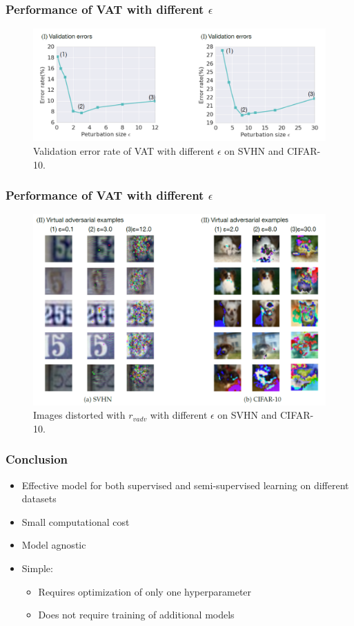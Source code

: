 \begin{frame}
\frametitle{Performance of VAT with different \(\epsilon\)}
\begin{figure}
\centering
\includegraphics[width=0.8\columnwidth]{different_eps_val.png}
\caption{Validation error rate of VAT with different \(\epsilon\) on SVHN and CIFAR-10.}
\label{fig:different_eps_val}
\end{figure}
\end{frame}

\begin{frame}
\frametitle{Performance of VAT with different \(\epsilon\)}
\begin{figure}
\centering
\includegraphics[width=0.8\columnwidth]{different_eps_images.png}
\caption{Images distorted with \(r_{vadv}\) with different \(\epsilon\) on SVHN and CIFAR-10.}
\label{fig:different_eps_images}
\end{figure}
\end{frame}

\begin{frame}
\frametitle{Conclusion}
\begin{itemize}
\item Effective model for both supervised and semi-supervised learning on different datasets
\item Small computational cost
\item Model agnostic
\item Simple:
\begin{itemize}
\item Requires optimization of only one hyperparameter
\item Does not require training of additional models
\end{itemize}
\end{itemize}

\end{frame}